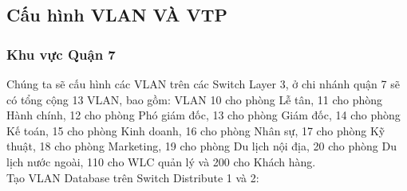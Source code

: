 \documentclass[a4paper, 12pt]{article}
\begin{document}
\subsection{Cấu hình VLAN VÀ VTP}
\subsubsection{Khu vực Quận 7}
\hspace*{1cm}Chúng ta sẽ cấu hình các VLAN trên các Switch Layer 3, ở chi nhánh quận 7 sẽ có tổng cộng 13 VLAN, bao gồm: VLAN 10 cho phòng Lễ tân, 11 cho phòng Hành chính, 12 cho phòng Phó giám đốc, 13 cho phòng Giám đốc, 14 cho phòng Kế toán, 15 cho phòng Kinh doanh, 16 cho phòng Nhân sự, 17 cho phòng Kỹ thuật, 18 cho phòng Marketing, 19 cho phòng Du lịch nội địa, 20 cho phòng Du lịch nước ngoài, 110 cho WLC quản lý và 200 cho Khách hàng.\\
\hspace*{1cm}Tạo VLAN Database trên Switch Distribute 1 và 2:\\
\end{document}
